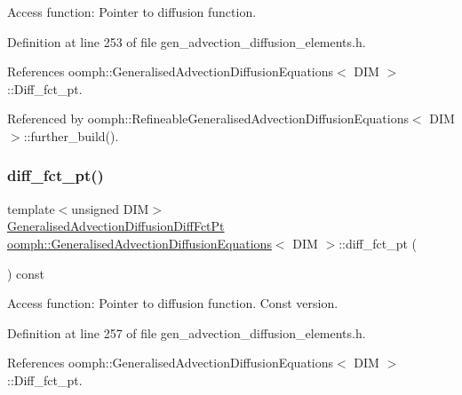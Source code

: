 Access function\+: Pointer to diffusion function. 



Definition at line 253 of file gen\+\_\+advection\+\_\+diffusion\+\_\+elements.\+h.



References oomph\+::\+Generalised\+Advection\+Diffusion\+Equations$<$ D\+I\+M $>$\+::\+Diff\+\_\+fct\+\_\+pt.



Referenced by oomph\+::\+Refineable\+Generalised\+Advection\+Diffusion\+Equations$<$ D\+I\+M $>$\+::further\+\_\+build().

\mbox{\label{classoomph_1_1GeneralisedAdvectionDiffusionEquations_a7e2bcd1880f2e58986c230aea5fa0e0a}} 
\subsubsection{\texorpdfstring{diff\+\_\+fct\+\_\+pt()}{diff\_fct\_pt()}\hspace{0.1cm}{\footnotesize\ttfamily [2/2]}}
{\footnotesize\ttfamily template$<$unsigned D\+IM$>$ \\
\hyperlink{classoomph_1_1GeneralisedAdvectionDiffusionEquations_a637371a9eebc399023c6a652e8219263}{Generalised\+Advection\+Diffusion\+Diff\+Fct\+Pt} \hyperlink{classoomph_1_1GeneralisedAdvectionDiffusionEquations}{oomph\+::\+Generalised\+Advection\+Diffusion\+Equations}$<$ D\+IM $>$\+::diff\+\_\+fct\+\_\+pt (\begin{DoxyParamCaption}{ }\end{DoxyParamCaption}) const\hspace{0.3cm}{\ttfamily [inline]}}



Access function\+: Pointer to diffusion function. Const version. 



Definition at line 257 of file gen\+\_\+advection\+\_\+diffusion\+\_\+elements.\+h.



References oomph\+::\+Generalised\+Advection\+Diffusion\+Equations$<$ D\+I\+M $>$\+::\+Diff\+\_\+fct\+\_\+pt.

